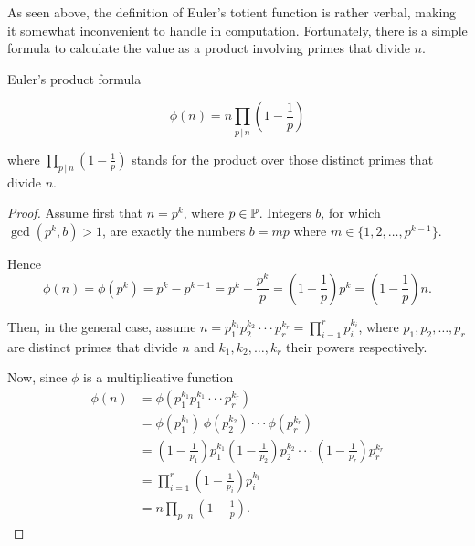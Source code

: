 \documentclass{article}
\begin{document}
As seen above, the definition of Euler's totient function is rather verbal, making it somewhat inconvenient to handle in computation. Fortunately, there is a simple formula to calculate the value as a product involving primes that divide $n$.

\begin{theorem}
Euler's product formula
\label{thm:product}


\begin{equation*}
    \phi(n) = n \prod_{p \,\vert\, n} \left(1 - \frac{1}{p}\right)
\end{equation*}

where $\prod_{p \,\vert\, n} \left(1 - \frac{1}{p}\right)$ stands for the product over those distinct primes that divide $n$.

\begin{proof}

Assume first that $n = p^k$, where $p\in \mathbb{P}$. Integers $b$, for which $\gcd(p^k,b)>1$, are exactly the numbers $b=mp$ where $m\in \{1,2,\dots,p^{k-1}\}$.

Hence
\begin{equation*}
    \phi(n)=\phi(p^k)=p^k-p^{k-1}=p^k-\frac{p^k}{p}=\left(1-\frac{1}{p}\right)p^k=\left(1-\frac{1}{p}\right)n.
\end{equation*}

Then, in the general case, assume $n=p_1^{k_1} p_2^{k_2} \cdot \cdot \cdot p_r^{k_r}=\prod_{i=1}^r p_i^{k_i}$, where $p_1,p_2,\dots,p_r$ are distinct primes that divide $n$ and $k_1,k_2,\dots,k_r$ their powers respectively. 


Now, since $\phi$ is a multiplicative function
\begin{align*}
    \phi(n) & = \phi(p_1^{k_1} p_1^{k_1} \cdot \cdot \cdot p_r^{k_r})\\
    & = \phi(p_1^{k_1})\,\phi(p_2^{k_2}) \cdot \cdot \cdot \phi(p_r^{k_r})\\
    & = \left(1-\frac{1}{p_1}\right)p_1^{k_1} \left(1-\frac{1}{p_2}\right)p_2^{k_2} \cdot \cdot \cdot \left(1-\frac{1}{p_r}\right)p_r^{k_r}\\
    & = \prod_{i=1}^r \left(1-\frac{1}{p_i}\right) p_i^{k_i}\\
    & = n \prod_{p \,\vert\, n} \left(1 - \frac{1}{p}\right).
\end{align*}

\end{proof}

\end{theorem}
\end{document}
